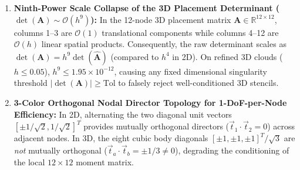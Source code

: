 \documentclass[preprint,12pt]{elsarticle}
\newcommand{\R}{\mathbb{R}}
\begin{document}
\begin{enumerate}
    \item \textbf{Ninth-Power Scale Collapse of the 3D Placement Determinant ($\det(\mathbf{A}) \sim \mathcal{O}(h^9)$):} In the 12-node 3D placement matrix $\mathbf{A} \in \R^{12\times 12}$, columns 1--3 are $\mathcal{O}(1)$ translational components while columns 4--12 are $\mathcal{O}(h)$ linear spatial products. Consequently, the raw determinant scales as $\det(\mathbf{A}) = h^9 \det(\widehat{\mathbf{A}})$ (compared to $h^4$ in 2D). On refined 3D clouds ($h \le 0.05$), $h^9 \le 1.95 \times 10^{-12}$, causing any fixed dimensional singularity threshold $|\det(\mathbf{A})| \ge \text{Tol}$ to falsely reject well-conditioned 3D stencils.
    \item \textbf{3-Color Orthogonal Nodal Director Topology for 1-DoF-per-Node Efficiency:} In 2D, alternating the two diagonal unit vectors $[\pm 1/\sqrt{2}, 1/\sqrt{2}]^T$ provides mutually orthogonal directors ($\vec{t}_1 \cdot \vec{t}_2 = 0$) across adjacent nodes. In 3D, the eight cubic body diagonals $[\pm 1, \pm 1, \pm 1]^T/\sqrt{3}$ are \emph{not} mutually orthogonal ($\vec{t}_a \cdot \vec{t}_b = \pm 1/3 \neq 0$), degrading the conditioning of the local $12\times 12$ moment matrix.
\end{enumerate}
\end{document}

